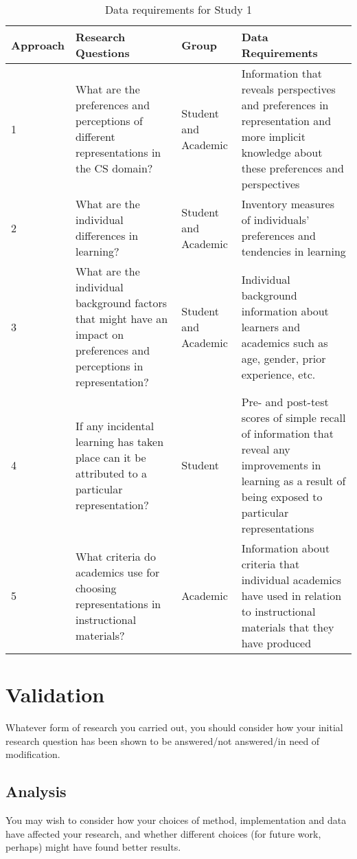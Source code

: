 \begin{table}[h]
	\begin{tabular}{ | p{1cm} | p{4.6cm} | p{2cm} | p{4.6cm} | }
	\hline
	Approach & Research Questions & Group &  Data Requirements \\
	\hline
	1 & What are the preferences and perceptions of different representations in the CS domain? & Student
and
Academic
 & Information that reveals perspectives and preferences in representation and more implicit knowledge about these preferences and perspectives \\
	\hline
	2 & What are the individual differences in learning? & Student
and
Academic
 & Inventory measures of individuals’ preferences and tendencies in learning \\
	\hline
	3 & What are the individual background factors that might have an impact on preferences and perceptions in representation? & Student
and
Academic
 & Individual background information about learners and academics such as age, gender, prior experience, etc. \\
	\hline
	4 & If any incidental learning has taken place can it be attributed to a particular representation? & Student & Pre- and post-test scores of simple recall of information that reveal any improvements in learning as a result of being exposed to particular representations \\
	\hline
	5 & What criteria do academics use for choosing representations in instructional materials? & Academic & Information about criteria that individual academics have used in relation to instructional materials that they have produced \\
	\hline
	\end{tabular}
	\caption{Data requirements for Study 1}
\end{table}

\section{Validation}
Whatever form of research you carried out, you should consider how your initial research question has been shown to be answered/not answered/in need of modification.

\subsection{Analysis}
You may wish to consider how your choices of method, implementation and data have affected your research, and whether different choices (for future work, perhaps) might have found better results.
